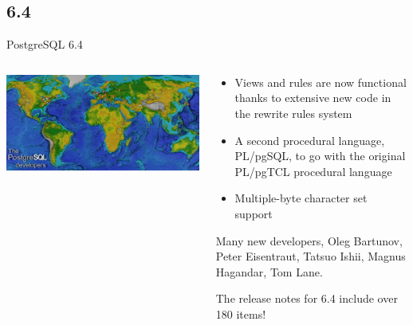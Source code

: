 \documentclass[t,10pt]{beamer}
\begin{document}
\subsection{6.4}
\begin{frame}{PostgreSQL 6.4}
  \begin{columns}[T]
    \begin{column}{0.3\textwidth}
      \includegraphics[width=1.1\textwidth,keepaspectratio=true]{assets/history-007.png}
    \end{column}
    \begin{column}{0.7\textwidth}
      \begin{itemize}%
      \item Views and rules are now functional thanks to extensive new code in the rewrite rules system
      \item A second procedural language, PL/pgSQL, to go with the original PL/pgTCL procedural language
      \item Multiple-byte character set support
      \end{itemize}
      Many new developers, Oleg Bartunov, Peter Eisentraut, Tatsuo Ishii, Magnus Hagandar, Tom Lane.

      The release notes for 6.4 include over 180 items!
    \end{column}
  \end{columns}
\end{frame}
\end{document}
